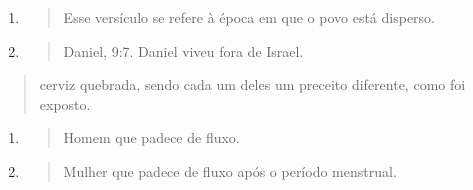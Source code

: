 \begin{enumerate}
\def\labelenumi{\arabic{enumi}.}
\setcounter{enumi}{95}
\item
  \begin{quote}
  Esse versículo se refere à época em que o povo está disperso.
  \end{quote}
\item
  \begin{quote}
  Daniel, 9:7. Daniel viveu fora de Israel.
  \end{quote}
\end{enumerate}

\begin{quote}
cerviz quebrada, sendo cada um deles um preceito diferente, como foi
exposto.
\end{quote}

\begin{enumerate}
\def\labelenumi{\arabic{enumi}.}
\setcounter{enumi}{97}
\item
  \begin{quote}
  Homem que padece de fluxo.
  \end{quote}
\item
  \begin{quote}
  Mulher que padece de fluxo após o período menstrual.
  \end{quote}
\end{enumerate}

